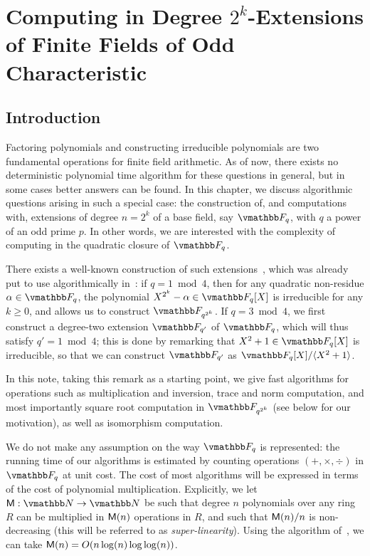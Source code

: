 \graphicspath{{roots_2ext/}}

\chapter[Computing in Degree $2^k$-Extensions of Finite Fields of \\ Odd Characteristic]
{Computing in Degree $2^k$-Extensions of Finite Fields of Odd Characteristic}
\label{chapter:2ext-op}

\section{Introduction}\label{section:intro}


Factoring polynomials and constructing irreducible polynomials are two
fundamental operations for finite field arithmetic. As of now, there
exists no deterministic polynomial time algorithm for these questions
in general, but in some cases better answers can be found. In this
chapter, we discuss algorithmic questions arising in such a special case:
the construction of, and computations with, extensions of degree
$n=2^k$ of a base field, say $\F_q$, with $q$ a power of an odd prime
$p$. In other words, we are interested with the complexity of
computing in the quadratic closure of $\F_q$.

There exists a well-known construction of such
extensions~\cite[Th.\ VI.9.1]{Lang02}, which was already put to use
algorithmically in~\cite{Shoup94}: if $q=1\bmod 4$, then for any
quadratic non-residue $\alpha \in \F_q$, the polynomial
$X^{2^k}-\alpha \in \F_q[X]$ is irreducible for any $k \ge 0$, and
allows us to construct $\F_{q^{2^k}}$. If $q=3\bmod 4$, we first
construct a degree-two extension $\F_{q'}$ of $\F_q$, which will thus
satisfy $q' = 1 \bmod 4$; this is done by remarking that $X^2+1 \in
\F_q[X]$ is irreducible, so that we can construct $\F_{q'}$ as
$\F_q[X]/\langle X^2+1 \rangle$.

In this note, taking this remark as a starting point, we give fast
algorithms for operations such as multiplication and inversion, trace
and norm computation, and most importantly square root computation in
$\F_{q^{2^k}}$ (see below for our motivation), as well as isomorphism
computation. 

We do not make any assumption on the way $\F_q$ is represented: the
running time of our algorithms is estimated by counting operations
$(+,\times,\div)$ in $\F_q$ at unit cost.  The cost of most algorithms
will be expressed in terms of the cost of polynomial
multiplication. Explicitly, we let $\MM:\N\to\N$ be such that degree
$n$ polynomials over any ring $R$ can be multiplied in $\mathsf{M}(n)$
operations in $R$, and such that $\mathsf{M}(n)/n$ is non-decreasing (this
will be referred to as {\em super-linearity}). Using the algorithm
of~\cite{CaKa91}, we can take $\mathsf{M}(n)=O(n \log(n)\log\log(n))$.

